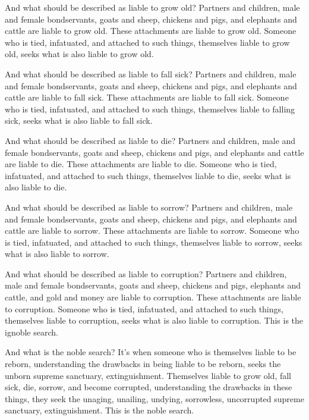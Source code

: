 \documentclass[12pt,openany]{book}%
\begin{document}
And what should be described as liable to grow old? Partners and children, male and female bondservants, goats and sheep, chickens and pigs, and elephants and cattle are liable to grow old. These attachments are liable to grow old. Someone who is tied, infatuated, and attached to such things, themselves liable to grow old, seeks what is also liable to grow old. 

And what should be described as liable to fall sick? Partners and children, male and female bondservants, goats and sheep, chickens and pigs, and elephants and cattle are liable to fall sick. These attachments are liable to fall sick. Someone who is tied, infatuated, and attached to such things, themselves liable to falling sick, seeks what is also liable to fall sick. 

And what should be described as liable to die? Partners and children, male and female bondservants, goats and sheep, chickens and pigs, and elephants and cattle are liable to die. These attachments are liable to die. Someone who is tied, infatuated, and attached to such things, themselves liable to die, seeks what is also liable to die. 

And what should be described as liable to sorrow? Partners and children, male and female bondservants, goats and sheep, chickens and pigs, and elephants and cattle are liable to sorrow. These attachments are liable to sorrow. Someone who is tied, infatuated, and attached to such things, themselves liable to sorrow, seeks what is also liable to sorrow. 

And what should be described as liable to corruption? Partners and children, male and female bondservants, goats and sheep, chickens and pigs, elephants and cattle, and gold and money are liable to corruption. These attachments are liable to corruption. Someone who is tied, infatuated, and attached to such things, themselves liable to corruption, seeks what is also liable to corruption. This is the ignoble search. 

And what is the noble search? It’s when someone who is themselves liable to be reborn, understanding the drawbacks in being liable to be reborn, seeks the unborn supreme sanctuary, extinguishment. Themselves liable to grow old, fall sick, die, sorrow, and become corrupted, understanding the drawbacks in these things, they seek the unaging, unailing, undying, sorrowless, uncorrupted supreme sanctuary, extinguishment. This is the noble search. 
\end{document}
